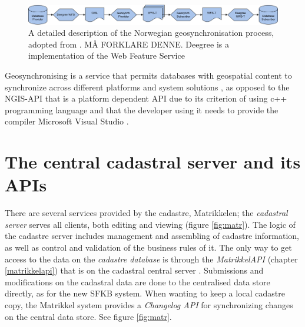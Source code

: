 \begin{figure}[H]
	\centering
	\includegraphics[scale=0.4]{img/geosynkkk.png}
	\caption{A detailed description of the Norwegian geosynchronisation process, adopted from \cite{Eggan2017}. MÅ FORKLARE DENNE. Deegree is a implementation of the Web Feature Service}
	\label{fig:geosyncprocess}
\end{figure}

Geosynchronising is a service that permits databases with geospatial content to synchronize across different platforms and system solutions \citep{Kartverket2013}, as opposed to the NGIS-API that is a platform dependent API due to its criterion of using c++ programming language and that the developer using it needs to provide the compiler Microsoft Visual Studio \citep{Kartverket2017b, Norkart2011}.

\section{The central cadastral server and its APIs}
There are several services provided by the cadastre, Matrikkelen; the \textit{cadastral server} serves all clients, both editing and viewing (figure \ref{fig:matr}). The logic of the cadastre server includes management and assembling of cadastre information, as well as control and validation of the business rules of it. The only way to get access to the data on the \textit{cadastre database} is through the \textit{MatrikkelAPI} (chapter \ref{matrikkelapi}) that is on the cadastral central server \citep[p.~338]{Matrikkelavdelingen2017}. Submissions and modifications on the cadastral data are done to the centralised data store directly, as for the new SFKB system. When wanting to keep a local cadastre copy, the Matrikkel system provides a \textit{Changelog API} for synchronizing changes on the central data store. See figure \ref{fig:matr}. 

